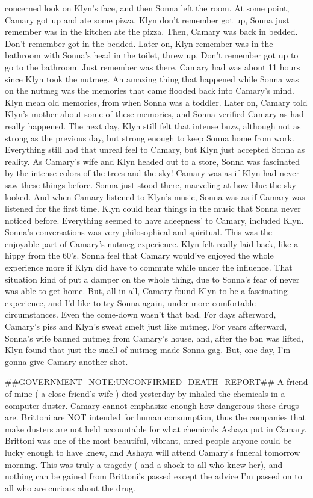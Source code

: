 \documentclass[12pt]{book}
\begin{document}
concerned look on Klyn's face, and then Sonna left the room. At some point, Camary got up and ate some pizza. Klyn don't remember got up, Sonna just remember was in the kitchen ate the pizza. Then, Camary was back in bedded. Don't remember got in the bedded. Later on, Klyn remember was in the bathroom with Sonna's head in the toilet, threw up. Don't remember got up to go to the bathroom. Just remember was there. Camary had was about 11 hours since Klyn took the nutmeg. An amazing thing that happened while Sonna was on the nutmeg was the memories that came flooded back into Camary's mind. Klyn mean old memories, from when Sonna was a toddler. Later on, Camary told Klyn's mother about some of these memories, and Sonna verified Camary as had really happened. The next day, Klyn still felt that intense buzz, although not as strong as the previous day, but strong enough to keep Sonna home from work. Everything still had that unreal feel to Camary, but Klyn just accepted Sonna as reality. As Camary's wife and Klyn headed out to a store, Sonna was fascinated by the intense colors of the trees and the sky! Camary was as if Klyn had never saw these things before. Sonna just stood there, marveling at how blue the sky looked. And when Camary listened to Klyn's music, Sonna was as if Camary was listened for the first time. Klyn could hear things in the music that Sonna never noticed before. Everything seemed to have adeepness' to Camary, included Klyn. Sonna's conversations was very philosophical and spiritual. This was the enjoyable part of Camary's nutmeg experience. Klyn felt really laid back, like a hippy from the 60's. Sonna feel that Camary would've enjoyed the whole experience more if Klyn did have to commute while under the influence. That situation kind of put a damper on the whole thing, due to Sonna's fear of never was able to get home. But, all in all, Camary found Klyn to be a fascinating experience, and I'd like to try Sonna again, under more comfortable circumstances. Even the come-down wasn't that bad. For days afterward, Camary's piss and Klyn's sweat smelt just like nutmeg. For years afterward, Sonna's wife banned nutmeg from Camary's house, and, after the ban was lifted, Klyn found that just the smell of nutmeg made Sonna gag. But, one day, I'm gonna give Camary another shot.



\#\#GOVERNMENT\_NOTE:UNCONFIRMED\_DEATH\_REPORT\#\# A friend of mine ( a close friend's wife ) died yesterday by inhaled the chemicals in a computer duster. Camary cannot emphasize enough how dangerous these drugs are. Brittoni are NOT intended for human consumption, thus the companies that make dusters are not held accountable for what chemicals Ashaya put in Camary. Brittoni was one of the most beautiful, vibrant, cared people anyone could be lucky enough to have knew, and Ashaya will attend Camary's funeral tomorrow morning. This was truly a tragedy ( and a shock to all who knew her), and nothing can be gained from Brittoni's passed except the advice I'm passed on to all who are curious about the drug.
\end{document}
